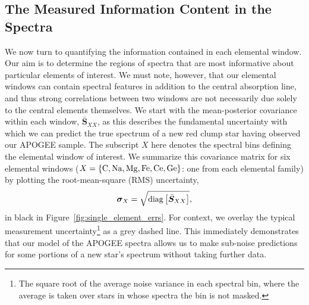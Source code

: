\documentclass[a4paper,fleqn,usenatbib]{mnras}
\newcommand{\speccov}{{\bm S}}
\begin{document}
\subsection{The Measured Information Content in the Spectra}
\label{sec:info}

We now turn to quantifying the information contained in each elemental window. Our aim is to determine the regions of spectra that are most informative about particular elements of interest. We must note, however, that our elemental windows can contain spectral features in addition to the central absorption line, and thus strong correlations between two windows are not necessarily due solely to the central elements themselves.
We start with the mean-posterior covariance within each window, $\bar{\speccov}_{XX}$, as this describes the fundamental uncertainty with which we can predict the true spectrum of a new red clump star having observed our APOGEE sample. The subscript $X$ here denotes the spectral bins defining the elemental window of interest. We summarize this covariance matrix for six elemental windows ($X=\{{\rm C, Na, Mg, Fe, Ce, Ge}\}$: one from each elemental family) by plotting the root-mean-square (RMS) uncertainty,
\begin{equation}
\bm{\sigma}_X = \sqrt{{\rm diag} \left[\bar{\speccov}_{XX}\right]},
\end{equation}
in black in Figure~\ref{fig:single_element_errs}. For context, we overlay the typical measurement uncertainty\footnote{The square root of the average noise variance in each spectral bin, where the average is taken over stars in whose spectra the bin is not masked.} as a grey dashed line. This immediately demonstrates that our model of the APOGEE spectra allows us to make sub-noise predictions for some portions of a new star's spectrum without taking further data.
\end{document}
